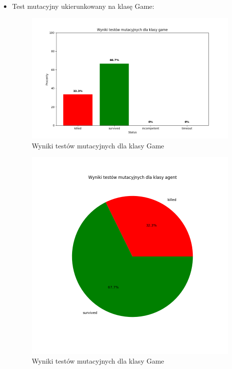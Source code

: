 \documentclass[12pt,a4paper]{article}
\begin{document}
\begin{enumerate}
\begin{itemize}
                    
                \item Test mutacyjny ukierunkowany na klasę Game:
                    \begin{figure}[H]
                        \centering
                        \includegraphics[width=0.8\linewidth]{media/wykresy/bar_game_mutual_test.png}
                        \caption{Wyniki testów mutacyjnych dla klasy Game}
                        \label{fig:enter-label}
                    \end{figure}
                    \begin{figure}[H]
                        \centering
                        \includegraphics[width=0.8\linewidth]{media/wykresy/pie_agent_mutual_test.png}
                        \caption{Wyniki testów mutacyjnych dla klasy Game}
                        \label{fig:enter-label}
                    \end{figure}
            \end{itemize}


\end{enumerate}
\end{document}
